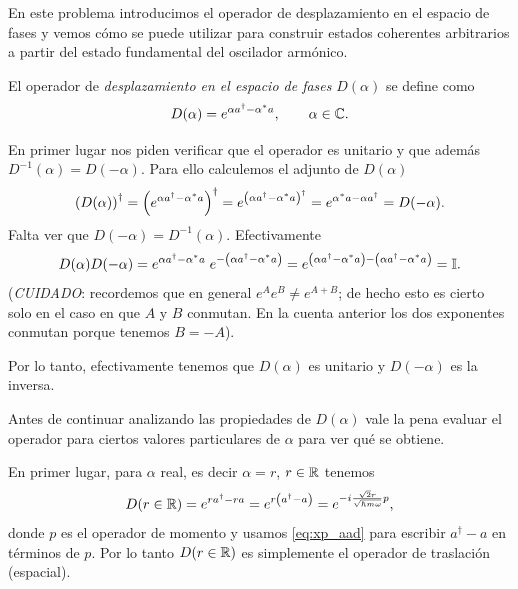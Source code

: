 \documentclass[10pt, a4paper]{article}
\numberwithin{equation}{subsection}
\begin{document}
En este problema introducimos el operador de desplazamiento en el espacio de
fases y vemos cómo se puede utilizar para construir estados coherentes
arbitrarios a partir del estado fundamental del oscilador armónico.

El operador de \emph{desplazamiento en el espacio de fases} $D(\alpha)$ se
define como
\begin{equation} \label{eq:def_phase_trans}
  D(\alpha) = e^{\alpha a^\dagger - {{\alpha}^{*}}a}, \qquad\alpha\in\mathbb{C}.
\end{equation}

\bigbreak

En primer lugar nos piden verificar que el operador es unitario y que además
$D^{-1}(\alpha) = D(-\alpha)$. Para ello calculemos el adjunto de $D(\alpha)$
\begin{equation}
  \left(D(\alpha)\right)^\dagger = \left(e^{\alpha a^\dagger -
    {{\alpha}^{*}}a}\right)^\dagger = e^{\left(\alpha a^\dagger -
    {{\alpha}^{*}}a\right)^\dagger} = e^{{{\alpha}^{*}} a - \alpha a^\dagger}
    = D(-\alpha).
\end{equation}
Falta ver que $D(-\alpha) = D^{-1}(\alpha)$. Efectivamente
\begin{equation}
  D(\alpha)D(-\alpha) =  e^{\alpha a^\dagger - {{\alpha}^{*}}a} \;
    e^{-\left(\alpha a^\dagger - {{\alpha}^{*}}a\right)} = 
    e^{\left(\alpha a^\dagger - {{\alpha}^{*}}a\right) -\left(\alpha a^\dagger -
    {{\alpha}^{*}}a\right)} = \mathbb{I}.
\end{equation}
(\emph{CUIDADO}: recordemos que en general $e^Ae^B \neq e^{A+B}$; de hecho esto
es cierto solo en el caso en que $A$ y $B$ conmutan. En la cuenta anterior los
dos exponentes conmutan porque tenemos $B = -A$).

Por lo tanto, efectivamente tenemos que $D(\alpha)$ es unitario y $D(-\alpha)$
es la inversa.

\bigbreak

Antes de continuar analizando las propiedades de $D(\alpha)$ vale la pena
evaluar el operador para ciertos valores particulares de $\alpha$ para ver qué
se obtiene.

En primer lugar, para $\alpha$ real, es decir $\alpha = r$, $r \in \mathbb{R}$
tenemos
\begin{equation}
  D(r\in\mathbb{R}) = e^{ra^\dagger - ra} = e^{r\left(a^\dagger - a\right)} =
    e^{-i\frac{\sqrt{2}r}{\sqrt{\hbar m \omega}}p},
\end{equation}
donde $p$ es el operador de momento y usamos \eqref{eq:xp_aad} para escribir
$a^\dagger - a$ en términos de $p$. Por lo tanto $D(r\in\mathbb{R})$ es simplemente
el operador de traslación (espacial).
\end{document}
